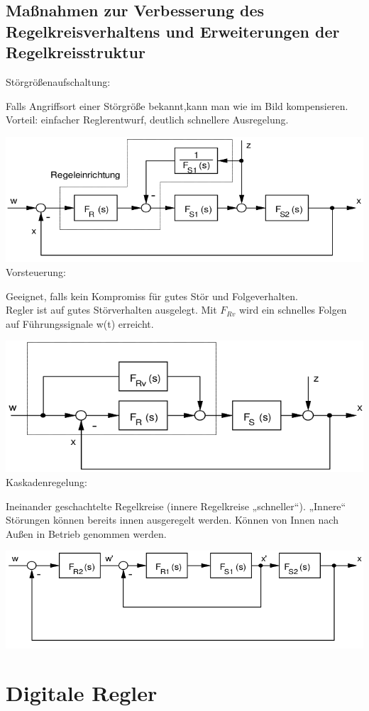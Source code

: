 \documentclass[10pt,a4paper]{article}
\begin{document}
    \subsection{Maßnahmen zur Verbesserung des Regelkreisverhaltens und Erweiterungen der Regelkreisstruktur}
    Störgrößenaufschaltung:
    \begin{mdframed}[style=exercise]
        Falls Angriffsort einer Störgröße bekannt,kann man wie im Bild kompensieren.\\
        Vorteil: einfacher Reglerentwurf, deutlich schnellere Ausregelung.
    \end{mdframed}
    \includegraphics[width=.45\textwidth]{Figures/Stoergoesenschaltung.png}\\
    Vorsteuerung:
    \begin{mdframed}[style=exercise]
        Geeignet, falls kein Kompromiss für gutes Stör und Folgeverhalten.\\
        Regler ist auf gutes Störverhalten ausgelegt. Mit $F_{Rv}$ wird ein schnelles Folgen
        auf Führungssignale w(t) erreicht.
    \end{mdframed}
    \includegraphics[width=.45\textwidth]{Figures/Vorsteuerung.png}\\
    Kaskadenregelung:
    \begin{mdframed}[style=exercise]
        Ineinander geschachtelte Regelkreise (innere Regelkreise „schneller“). „Innere“
        Störungen können bereits innen ausgeregelt werden. Können von Innen nach Außen in Betrieb genommen werden.
    \end{mdframed}
    \includegraphics[width=.45\textwidth]{Figures/Kaskadenregelung.png}\\
\section{Digitale Regler}
\end{document}
